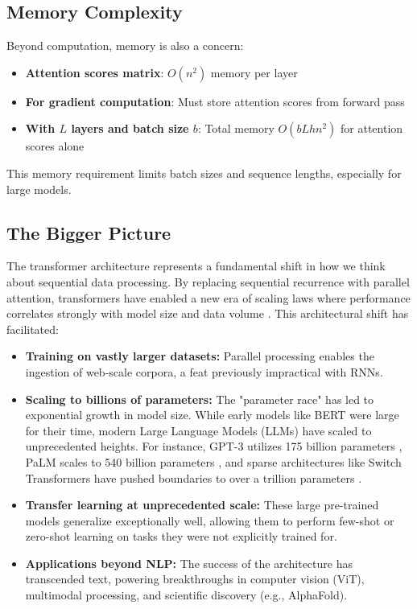 \subsection{Memory Complexity}

Beyond computation, memory is also a concern:
\begin{itemize}
  \item \textbf{Attention scores matrix}: $O(n^2)$ memory per layer
  \item \textbf{For gradient computation}: Must store attention scores from forward pass
  \item \textbf{With $L$ layers and batch size $b$}: Total memory $O(bLhn^2)$ for attention scores alone
\end{itemize}

This memory requirement limits batch sizes and sequence lengths, especially for large models.


\subsection{The Bigger Picture}

The transformer architecture represents a fundamental shift in how we think about sequential data processing. By replacing sequential recurrence with parallel attention, transformers have enabled a new era of scaling laws where performance correlates strongly with model size and data volume \cite{kaplan2020scaling}. This architectural shift has facilitated:

\begin{itemize}
    \item \textbf{Training on vastly larger datasets:} Parallel processing enables the ingestion of web-scale corpora, a feat previously impractical with RNNs.
    \item \textbf{Scaling to billions of parameters:} The "parameter race" has led to exponential growth in model size. While early models like BERT were large for their time, modern Large Language Models (LLMs) have scaled to unprecedented heights. For instance, GPT-3 utilizes 175 billion parameters \cite{brown2020language}, PaLM scales to 540 billion parameters \cite{chowdhery2022palm}, and sparse architectures like Switch Transformers have pushed boundaries to over a trillion parameters \cite{fedus2022switch}.
    \item \textbf{Transfer learning at unprecedented scale:} These large pre-trained models generalize exceptionally well, allowing them to perform few-shot or zero-shot learning on tasks they were not explicitly trained for.
    \item \textbf{Applications beyond NLP:} The success of the architecture has transcended text, powering breakthroughs in computer vision (ViT), multimodal processing, and scientific discovery (e.g., AlphaFold).
\end{itemize}

